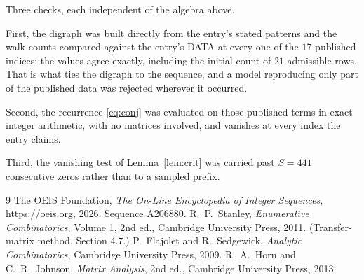 \documentclass[11pt,a4paper]{article}
\theoremstyle{plain}
\theoremstyle{definition}
\begin{document}
Three checks, each independent of the algebra above.

First, the digraph was built directly from the entry's stated patterns and the walk counts
compared against the entry's DATA at every one of the $17$ published indices; the
values agree exactly, including the initial count of $21$ admissible rows. That is
what ties the digraph to the sequence, and a model reproducing only part of the published
data was rejected wherever it occurred.

Second, the recurrence \eqref{eq:conj} was evaluated on those published terms in exact
integer arithmetic, with no matrices involved, and vanishes at every index the entry claims.

Third, the vanishing test of Lemma~\ref{lem:crit} was carried past $S=441$ consecutive
zeros rather than to a sampled prefix.

\begin{thebibliography}{9}
 The OEIS Foundation, \emph{The On-Line Encyclopedia of Integer
Sequences}, \url{https://oeis.org}, 2026. Sequence A206880.
 R.~P.~Stanley, \emph{Enumerative Combinatorics}, Volume 1, 2nd ed.,
Cambridge University Press, 2011. (Transfer-matrix method, Section 4.7.)
 P.~Flajolet and R.~Sedgewick, \emph{Analytic Combinatorics}, Cambridge
University Press, 2009.
 R.~A.~Horn and C.~R.~Johnson, \emph{Matrix Analysis}, 2nd ed., Cambridge
University Press, 2013.
\end{thebibliography}
\end{document}

